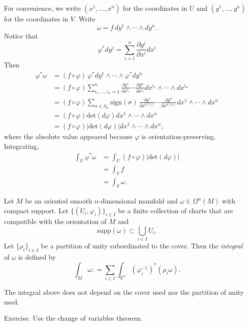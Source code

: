 \documentclass{ximera}
\begin{document}
\begin{solution}
For convenience, we write $(x^1, \ldots , x^n)$ for the coordinates in $U$ and $(y^1, \ldots , y^n)$ for the coordinates in $V$. 
Write 
\[      \omega = f \, dy^1 \wedge \cdots \wedge dy^n   .          \] 
Notice that 
\[      \varphi ^{\ast} dy ^j = \sum_{i =1 } ^n \frac{\partial y ^j }{\partial x^i } dx ^i                \]
Then 
\begin{align*}
          \varphi ^{\ast} \omega & = ( f \circ \varphi )  \, \varphi ^{\ast }dy^1 \wedge \cdots \wedge \varphi ^{\ast}  dy^n \\
          & =  (f \circ \varphi ) \sum _{i_1,  \ldots, i_n  = 1 } ^n \frac{\partial y ^1}{\partial x ^{i_1}} \cdots \frac{\partial y ^n}{\partial x ^{i_n}}   dx^{i_1} \wedge \cdots \wedge dx ^{i_n} \\
          & = (f \circ \varphi ) \sum _{\sigma \in S_n} \text{sign}(\sigma)\, \frac{\partial y ^{ 1}}{\partial x ^{\sigma (1) }} \cdots \frac{\partial y ^{n}}{\partial x ^{\sigma (n) }}   dx^1 \wedge \cdots \wedge dx ^n  \\
          & = (f \circ \varphi ) \text{det} (d\varphi ) dx^1 \wedge \cdots \wedge dx ^n \\
          & = (f \circ \varphi ) \vert  \text{det} (d\varphi ) \vert  dx^1 \wedge \cdots \wedge dx ^n,
  \end{align*}
where the absolute value appeared because $\varphi$ is orientation-preserving.  Integrating, 
\begin{align*}
    \int_U \varphi ^{\ast} \omega & = \int_{U} (f \circ \varphi ) \vert  \text{det} (d\varphi ) \vert \\
    & = \int_V f \\
    & = \int _V \omega. 
\end{align*}


\begin{definition}
    Let $M$ be an oriented smooth $n$-dimensional manifold and  $\omega \in \Omega ^n (M)$ with compact support. Let $\{ (U_i , \varphi_i )\} _{i \in I}$ be a finite collection of charts that are compatible with the orientation of $M$ and 
    \[     \text{supp} (\omega) \subset \bigcup _{i \in I} U_i .       \]
    Let $\{ \rho _i \} _{i \in I}$ be a partition of unity subordinated to the cover. Then the \emph{integral} of $\omega $ is defined by 
    \[      \int_M \omega  : = \sum _{i \in I} \int_{\mathbb{R}^n} ( \varphi _i ^{-1} ) ^{\ast} (  \rho _i \omega ).              \]
\end{definition}

\begin{proposition}
    The integral above does not depend on the cover used nor the partition of unity used. 
\end{proposition}

\begin{solution}
    Exercise. Use the change of variables theorem. 
\end{solution}




    
\end{solution}
\end{document}
